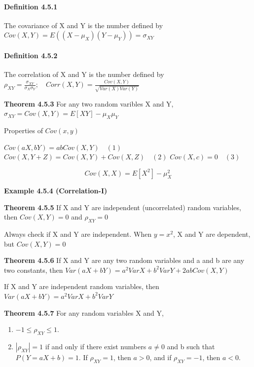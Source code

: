 \documentclass[6pt,Portrait]{article}
\providecommand{\tightlist}{%
  \setlength{\itemsep}{0pt}\setlength{\parskip}{0pt}}
\let\oldparagraph\paragraph
\renewcommand{\paragraph}[1]{\oldparagraph{#1}\mbox{}}
\begin{document}
\hypertarget{Cov}{%
\paragraph{\texorpdfstring{\textbf{Definition
4.5.1}}{Definition 4.5.1}}\label{Cov}}

The covariance of X and Y is the number defined by
\(Cov(X,Y)=E((X-\mu_X)(Y-\mu_Y))=\sigma_{XY}\)

\hypertarget{Cor}{%
\paragraph{\texorpdfstring{\textbf{Definition
4.5.2}}{Definition 4.5.2}}\label{Cor}}

The correlation of X and Y is the number defined by
\(\rho_{XY}=\frac{\sigma_{XY}}{\sigma_X\sigma_Y};\quad Corr(X,Y)=\frac{Cov(X,Y)}{\sqrt{Var(X)Var(Y)}}\)

\textbf{Theorem 4.5.3} For any two random varibles X and Y,
\(\sigma_{XY}=Cov(X,Y)=E[XY]-\mu_X\mu_Y\)

Properties of \(Cov(x,y)\)

\(Cov(aX,bY)=abCov(X,Y)\quad (1)\)
\(Cov(X,Y+Z)=Cov(X,Y)+Cov(X,Z)\quad (2)\) \(Cov(X,c)=0\quad (3)\)

\[Cov(X,X)=E[X^2]-\mu_X^2\]

\textbf{Example 4.5.4 (Correlation-I)}

\textbf{Theorem 4.5.5} If X and Y are independent (uncorrelated) random
variables, then \(Cov(X,Y)=0\) and \(\rho_{XY}=0\)

Always check if X and Y are independent. When \(y=x^2\), X and Y are
dependent, but \(Cov(X,Y)=0\)

\textbf{Theorem 4.5.6} If X and Y are any two random variables and a and
b are any two constants, then \(Var(aX+bY)=a^2VarX+b^2VarY+2abCov(X,Y)\)

If X and Y are independent random variables, then
\(Var(aX+bY)=a^2VarX+b^2VarY\)

\textbf{Theorem 4.5.7} For any random variables X and Y,

\begin{enumerate}
\def\labelenumi{\alph{enumi}.}
\tightlist
\item
  \(-1\le \rho_{XY}\le1\).
\item
  \(|\rho_{XY}|=1\) if and only if there exist numbers \(a\neq0\) and b
  such that \(P(Y=aX+b)=1\). If \(\rho_{XY}=1\), then \(a>0\), and if
  \(\rho_{XY}=-1\), then \(a<0\).
\end{enumerate}
\end{document}
